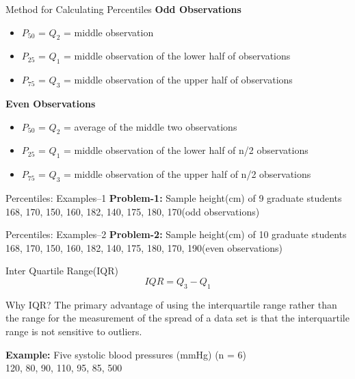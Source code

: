 \documentclass[10pt,dvipsnames, aspectratio=169]{beamer}
\begin{document}
\begin{frame}[t]{Method for Calculating Percentiles}
	\textbf{Odd Observations}
	\begin{itemize}
		\item $P_{50}$ = $Q_2$ = middle observation
		\item $P_{25}$ = $Q_1$ = middle observation of the lower half of
		observations
		\item $P_{75}$ = $Q_3$ = middle observation of the upper half of
		observations
	\end{itemize}
	
	
	\textbf{Even Observations}
	\begin{itemize}
		\item $P_{50}$ = $Q_2$ = average of the middle two observations
		\item $P_{25}$ = $Q_1$ = middle observation of the lower half of n/2
		observations
		\item $P_{75}$ = $Q_3$ = middle observation of the upper half of n/2
		observations
	\end{itemize}
\end{frame}

\begin{frame}[t]{Percentiles: Examples--1}
	\textbf{Problem-1:} Sample height(cm) of 9 graduate students 168, 170, 150, 
	160, 182, 140, 175, 180, 170(odd observations)
\end{frame}


\begin{frame}[t]{Percentiles: Examples--2}
	\textbf{Problem-2:} Sample height(cm) of 10 graduate students 168, 170, 
	150, 
	160, 182, 140, 175, 180, 170, 190(even observations)
\end{frame}



\begin{frame}[t]{Inter Quartile Range(IQR)}
	$$
	IQR = Q_3 - Q_1
	$$
\end{frame}

\begin{frame}[t]{Why IQR?}
	The primary advantage of using the interquartile range rather than the 
	range for the
	measurement of the spread of a data set is that the interquartile range is 
	not sensitive to outliers.
	
	\textbf{Example:}	Five systolic blood pressures (mmHg) (n = 6) \\
	120, 80, 90, 110, 95, 85, 500
\end{frame}
\end{document}

